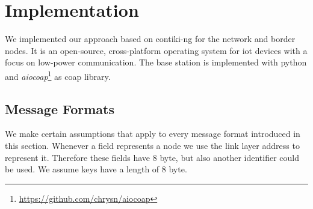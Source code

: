 \documentclass[conference]{IEEEtran}
\begin{document}
\section{Implementation}\label{sec:implementation}
We implemented our approach based on contiki-ng for the network and border nodes.
It is an open-source, cross-platform operating system for \ac{iot} devices with a focus on low-power communication.
The base station is implemented with python and \textit{aiocoap}\footnote{\url{https://github.com/chrysn/aiocoap}} as \ac{coap} library.

\subsection{Message Formats}\label{sec:implementation:message_formats}
We make certain assumptions that apply to every message format introduced in this section.
Whenever a field represents a node we use the link layer address to represent it.
Therefore these fields have 8 byte, but also another identifier could be used.
We assume keys have a length of 8 byte.
\end{document}
